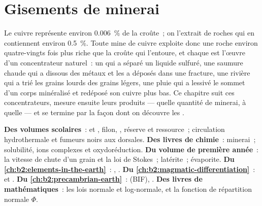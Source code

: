 \chapter{Gisements de minerai}\label{ch:b2:ore-deposits}

Le cuivre représente environ \qty{0.006}{\percent} de la croûte~; on l'extrait de roches qui en
contiennent environ \qty{0.5}{\percent}. Toute mine de cuivre exploite donc une roche environ
quatre-vingts fois plus riche que la croûte qui l'entoure, et chaque  est
l'œuvre d'un concentrateur naturel~: un  qui a séparé un liquide sulfuré, une saumure chaude
qui a dissous des métaux et les a déposés dans une fracture, une rivière qui a trié les grains
lourds des grains légers, une pluie qui a lessivé le sommet d'un corps minéralisé et redéposé son
cuivre plus bas. Ce chapitre suit ces concentrateurs, mesure ensuite leurs produits --- quelle quantité de minerai, à quelle  --- et se termine par la façon dont on découvre les .

\begin{recall}
\textbf{Des volumes scolaires}~:  et , filon, , réserve et
ressource~; circulation hydrothermale et fumeurs noirs aux dorsales. \textbf{Des livres de chimie}~:
minerai~; solubilité, ions complexes et oxydoréduction. \textbf{Du volume de première année}~: la
vitesse de chute d'un grain et la loi de Stokes~; latérite~; évaporite. \textbf{Du
\cref{ch:b2:elements-in-the-earth}}~: , . \textbf{Du \cref{ch:b2:magmatic-differentiation}}~:  et .
\textbf{Du \cref{ch:b2:precambrian-earth}}~:  (BIF), .
\textbf{Des livres de mathématiques}~: les lois normale et log-normale, et la fonction de
répartition normale $\Phi$.
\end{recall}

